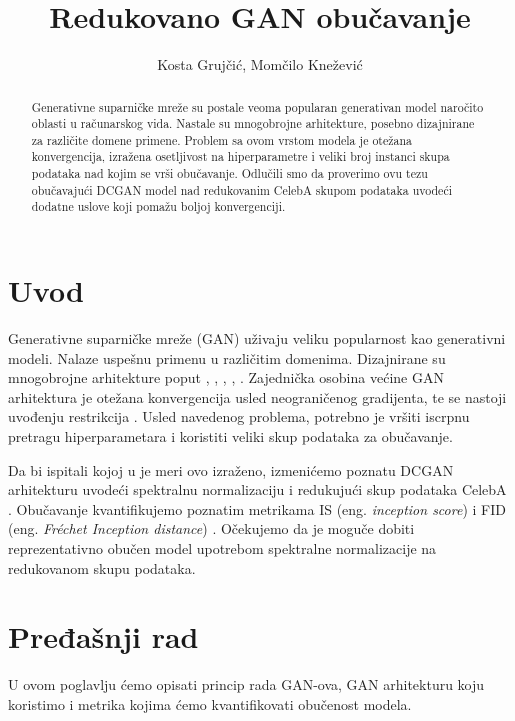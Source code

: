 \documentclass[12pt, a4paper]{article}
\begin{document}
\date{}
\title{Redukovano GAN obučavanje}
\author{Kosta Grujčić, Momčilo Knežević}
\maketitle

\begin{abstract}
Generativne suparničke mreže su postale veoma popularan generativan model naročito oblasti u računarskog vida. Nastale su mnogobrojne arhitekture, posebno dizajnirane za različite domene primene. Problem sa ovom vrstom modela je otežana konvergencija, izražena osetljivost na hiperparametre i veliki broj instanci skupa podataka nad kojim se vrši obučavanje. Odlučili smo da proverimo ovu tezu obučavajući DCGAN model nad redukovanim CelebA skupom podataka uvodeći dodatne uslove koji pomažu boljoj konvergenciji.
\end{abstract}

\section{Uvod}
Generativne suparničke mreže (GAN) \cite{GAN-2014} uživaju veliku popularnost kao generativni modeli. Nalaze uspešnu primenu u različitim domenima. Dizajnirane su mnogobrojne arhitekture poput \cite{DCGAN-2016}, \cite{WGAN-2017}, \cite{CGAN-2014}, \cite{StyleGAN-2018}, \cite{StyleGAN2-2019}. Zajednička osobina većine GAN arhitektura je otežana konvergencija usled neograničenog gradijenta, te se nastoji uvođenju restrikcija \cite{Lipschitz-2017}. Usled navedenog problema, potrebno je vršiti iscrpnu pretragu hiperparametara i koristiti veliki skup podataka za obučavanje.

Da bi ispitali kojoj u je meri ovo izraženo, izmenićemo poznatu DCGAN arhitekturu uvodeći spektralnu normalizaciju \cite{SN-2018} i redukujući skup podataka CelebA \cite{CelebA-2015}. Obučavanje kvantifikujemo poznatim metrikama IS (eng. \textit{inception score}) \cite{IS-2016} i FID (eng. \textit{Fréchet Inception distance}) \cite{FID-2017}. Očekujemo da je moguče dobiti reprezentativno obučen model upotrebom spektralne normalizacije na redukovanom skupu podataka.

\section{Pređašnji rad}
U ovom poglavlju ćemo opisati princip rada GAN-ova, GAN arhitekturu koju koristimo i metrika kojima ćemo kvantifikovati obučenost modela.
\end{document}
